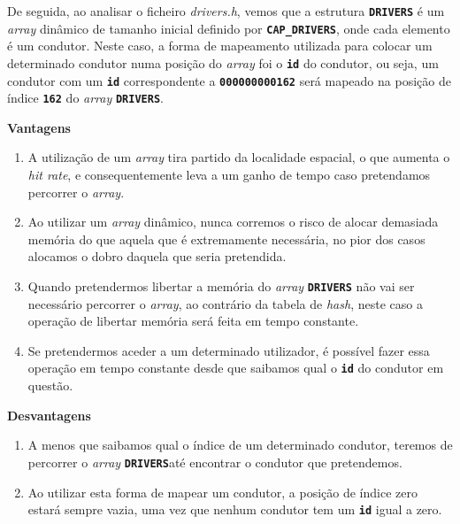 \documentclass[12pt,a4paper]{report}
\begin{document}
De seguida, ao analisar o ficheiro \textit{drivers.h}, vemos que a estrutura \textbf{\small\texttt{DRIVERS}} é um \textit{array} dinâmico de tamanho inicial definido por \textbf{\small\texttt{CAP\_DRIVERS}}, onde cada elemento é um condutor. Neste caso, a forma de mapeamento utilizada para colocar um determinado condutor numa posição do \textit{array} foi o \textbf{\small\texttt{id}} do condutor, ou seja, um condutor com um \textbf{\small\texttt{id}} correspondente a \textbf{\small\texttt{000000000162}} será mapeado na posição de índice \textbf{\small\texttt{162}} do \textit{array} \textbf{\small\texttt{DRIVERS}}.


\normalsize\textbf{Vantagens}
    \begin{enumerate}
        \item A utilização de um \textit{array} tira partido da localidade espacial, o que aumenta o \textit{hit rate}, e consequentemente leva a um ganho de tempo caso pretendamos percorrer o \textit{array}.
        
        \item Ao utilizar um \textit{array} dinâmico, nunca corremos o risco de alocar demasiada memória do que aquela que é extremamente necessária, no pior dos casos alocamos o dobro daquela que seria pretendida.
        
        \pagebreak
        \item Quando pretendermos libertar a memória do \textit{array} \textbf{\small\texttt{DRIVERS}} não vai ser necessário percorrer o \textit{array}, ao contrário da tabela de \textit{hash}, neste caso a operação de libertar memória será feita em tempo constante.
        
        \item Se pretendermos aceder a um determinado utilizador, é possível fazer essa operação em tempo constante desde que saibamos qual o \textbf{\small\texttt{id}} do condutor em questão.
    \end{enumerate}

\normalsize\textbf{Desvantagens}
    \begin{enumerate}
        \item A menos que saibamos qual o índice de um determinado condutor, teremos de percorrer o \textit{array} \textbf{\small\texttt{DRIVERS}}até encontrar o condutor que pretendemos.

        \item Ao utilizar esta forma de mapear um condutor, a posição de índice zero estará sempre vazia, uma vez que nenhum condutor tem um \textbf{\small\texttt{id}} igual a zero.
    \end{enumerate}
\end{document}

